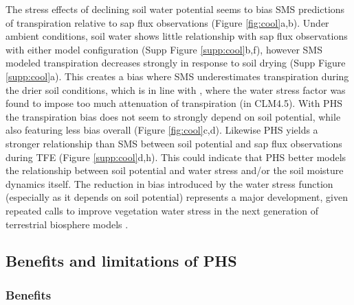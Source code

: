\documentclass[draft,linenumbers]{agujournal}
\begin{document}
    The stress effects of declining soil water potential seems to bias SMS predictions of transpiration relative to sap flux observations (Figure \ref{fig:cool}a,b).
    Under ambient conditions, soil water shows little relationship with sap flux observations with either model configuration (Supp Figure \ref{supp:cool}b,f),
    however SMS modeled transpiration decreases strongly in response to soil drying (Supp Figure \ref{supp:cool}a).
    This creates a bias where SMS underestimates transpiration during the drier soil conditions, 
    which is in line with \cite{bonan2014}, where the water stress factor was found to impose too much attenuation of transpiration (in CLM4.5).
    With PHS the transpiration bias does not seem to strongly depend on soil potential, while also featuring less bias overall (Figure \ref{fig:cool}c,d).
    Likewise PHS yields a stronger relationship than SMS between soil potential and sap flux observations during TFE (Figure \ref{supp:cool}d,h).
    This could indicate that PHS better models the relationship between soil potential and water stress and/or the soil moisture dynamics itself. 
    The reduction in bias introduced by the water stress function (especially as it depends on soil potential) represents a major development, given repeated calls to improve vegetation water stress in the next generation of terrestrial biosphere models \citep{powell2013,rogers2017}.

    


\subsection{Benefits and limitations of PHS}

\subsubsection{Benefits}
\end{document}

